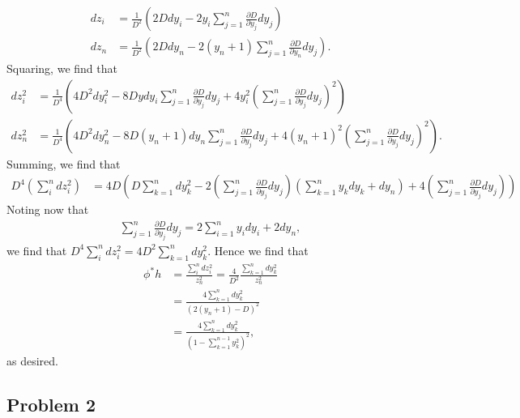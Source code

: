 \documentclass{../mathnotes}
\begin{document}
\begin{enumerate}[(a)]
\begin{align*}
            dz_i &= \frac{1}{D^2}\left( 2Ddy_i-2y_i\sum_{j=1}^n\frac{\partial D}{\partial y_j}dy_j \right) \\
            dz_n &= \frac{1}{D^2}\left( 2Ddy_n-2(y_n+1)\sum_{j=1}^n\frac{\partial D}{\partial y_n}dy_j \right).
        \end{align*}
        Squaring, we find that
        \begin{align*}
            dz_i^2 &= \frac{1}{D^4}\left( 4D^2dy_i^2-8Dydy_i\sum_{j=1}^n\frac{\partial D}{\partial y_j}dy_j+4y_i^2\left( \sum_{j=1}^n\frac{\partial D}{\partial y_j}dy_j \right)^2 \right)\\
            dz_n^2 &= \frac{1}{D^4}\left( 4D^2dy_n^2-8D(y_n+1)dy_n\sum_{j=1}^n\frac{\partial D}{\partial y_j}dy_j+4(y_n+1)^2\left( \sum_{j=1}^n\frac{\partial D}{\partial y_j}dy_j \right)^2 \right).
        \end{align*}
        Summing, we find that
        \begin{align*}
            D^4(\sum_i^ndz_i^2) &= 
            4D\left( D\sum_{k=1}^ndy_k^2-2\left( \sum_{j=1}^n\frac{\partial D}{\partial y_j}dy_j \right)\left( \sum_{k=1}^ny_kdy_k+dy_n \right)+4\left( \sum_{j=1}^n\frac{\partial D}{\partial y_j}dy_j \right)\right)
        \end{align*}
        Noting now that
        \begin{align*}
            \sum_{j=1}^n\frac{\partial D}{\partial y_j}dy_j=2\sum_{i=1}^ny_idy_i + 2dy_n,
        \end{align*}
        we find that $D^4\sum_i^ndz_i^2=4D^2\sum_{k=1}^ndy_k^2$. Hence we find that
        \begin{align*}
            \phi^*h &= \frac{\sum_i^ndz_i^2}{z_n^2} = \frac{4}{D^2}\frac{\sum_{k=1}^ndy_k^2}{z_n^2}\\
            &= \frac{4\sum_{k=1}^ndy_k^2}{\left( 2(y_n+1)-D \right)^2}\\
            &= \frac{4\sum_{k=1}^ndy_k^2}{\left( 1-\sum_{k=1}^{n-1}y_k^2 \right)^2},
        \end{align*}
        as desired.
\end{enumerate}

\subsection*{Problem 2}
\end{document}
